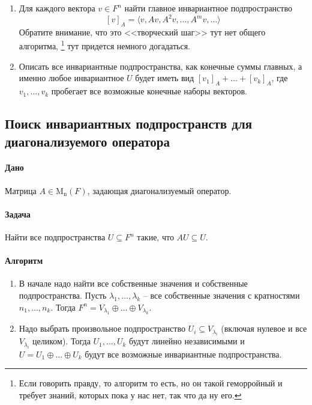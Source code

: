 \documentclass{article}
\newcommand{\Matrix}[2]{\operatorname{\mathrm{M}_{#2}}(#1)}
\begin{document}
\begin{enumerate}
\item Для каждого вектора $v\in F^n$ найти главное инвариантное подпространство
\[
[v]_A = \langle v, Av, A^2v, \ldots, A^mv, \ldots\rangle
\]
Обратите внимание, что это <<творческий шаг>> тут нет общего алгоритма,%
\footnote{Если говорить правду, то алгоритм то есть, но он такой геморройный и требует знаний, которых пока у нас нет, так что да ну его.}
тут придется немного догадаться.

\item Описать все инвариантные подпространства, как конечные суммы главных, а именно любое инвариантное $U$ будет иметь вид $[v_1]_A + \ldots +[v_k]_A$, где $v_1,\ldots, v_k$ пробегает все возможные конечные наборы векторов.
\end{enumerate}


\subsection{Поиск инвариантных подпространств для диагонализуемого оператора}

\paragraph{Дано}

Матрица $A\in\Matrix{F}{n}$, задающая диагонализуемый оператор.

\paragraph{Задача}

Найти все подпространства $U\subseteq F^n$ такие, что $A U \subseteq U$.

\paragraph{Алгоритм}

\begin{enumerate}
\item В начале надо найти все собственные значения и собственные подпространства.
Пусть $\lambda_1,\ldots, \lambda_k$ -- все собственные значения с кратностями $n_1,\ldots,n_k$.
Тогда $F^n = V_{\lambda_1}\oplus \ldots \oplus V_{\lambda_k}$.

\item Надо выбрать произвольное подпространство $U_i\subseteq V_{\lambda_i}$ (включая нулевое и все $V_{\lambda_i}$ целиком).
Тогда $U_1,\ldots, U_k$ будут линейно независимыми и $U = U_1 \oplus \ldots \oplus U_k$ будут все возможные инвариантные подпространства.
\end{enumerate}
\end{document}
